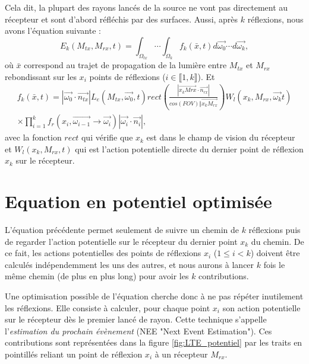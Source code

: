 Cela dit, la plupart des rayons lancés de la source ne vont pas directement au récepteur et sont d'abord réfléchis par des surfaces. Aussi, après $k$ réflexions, nous avons l'équation suivante :
\large \begin{equation}
    E_k(M_{tx}, M_{rx}, t) =
        \int_{\Omega_{tx}} \cdots
            \int_{\Omega_k}
                f_k(\bar{x}, t)
            d\overrightarrow{\omega_0}
            \cdots
        d\overrightarrow{\omega_k}
,\end{equation} \normalsize
où $\bar{x}$ correspond au trajet de propagation de la lumière entre $M_{tx}$ et $M_{rx}$ rebondissant sur les $x_i$ points de réflexions ($i \in \llbracket1, k\rrbracket$). Et 
\large \begin{multline}
    f_k(\bar{x}, t) =
        | \overrightarrow{\omega_0} \cdot \overrightarrow{n_{tx}} |
        L_e(M_{tx}, \overrightarrow{\omega_0}, t)
        rect\left(
            \frac
                {| \overrightarrow{x_k M{rx}} \cdot \overrightarrow{n_{rx}} |}
                {cos(FOV) \Vert \overrightarrow{x_k M_{rx}}}
        \right)
        W_l(x_k, M_{rx}, \overrightarrow{\omega_k} t) \\
        \times
        \prod\limits_{i=1}^k
            f_r(x_i, \overrightarrow{\omega_{i-1}} \longrightarrow \overrightarrow{\omega_i})
            | \overrightarrow{\omega_i} \cdot \overrightarrow{n_i} |
,\end{multline} \normalsize
avec la fonction $rect$ qui vérifie que $x_k$ est dans le champ de vision du récepteur et $W_l(x_k, M_{rx}, t)$ qui est l'action potentielle directe du dernier point de réflexion $x_k$ sur le récepteur.

\section{Equation en potentiel optimisée}
\label{sec:LTE}

L'équation précédente permet seulement de suivre un chemin de $k$ réflexions puis de regarder l'action potentielle sur le récepteur du dernier point $x_k$ du chemin. De ce fait, les actions potentielles des points de réflexions $x_i$ ($1 \leq i < k$) doivent être calculés indépendemment les uns des autres, et nous aurons à lancer $k$ fois le même chemin (de plus en plus long) pour avoir les $k$ contributions.\newline\par

Une optimisation possible de l'équation cherche donc à ne pas répéter inutilement les réflexions. Elle consiste à calculer, pour chaque point $x_i$ son action potentielle sur le récepteur dès le premier lancé de rayon. Cette technique s'appelle l'\textit{estimation du prochain évènement} (NEE "Next Event Estimation"). Ces contributions sont représentées dans la figure \ref{fig:LTE_potentiel} par les traits en pointillés reliant un point de réflexion $x_i$ à un récepteur $M_{rx}$.\newline


